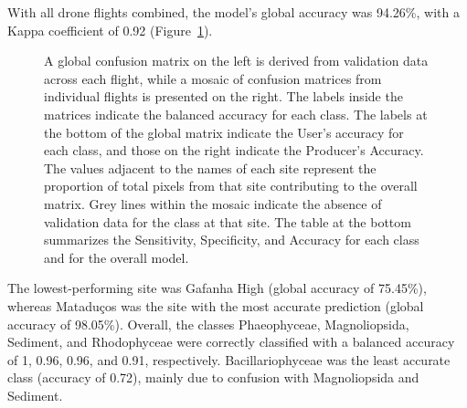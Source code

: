 \documentclass[
  letterpaper,
  11pt,
  english,
  singlespacing,
  headsepline]{MastersDoctoralThesis}
\begin{document}
\begin{spacing}{1.5}
With all drone flights combined, the model's global accuracy was
94.26\%, with a Kappa coefficient of 0.92 (Figure~\ref{fig-Validation}).

\begin{figure}


\caption{\label{fig-Validation}A global confusion matrix on the left is
derived from validation data across each flight, while a mosaic of
confusion matrices from individual flights is presented on the right.
The labels inside the matrices indicate the balanced accuracy for each
class. The labels at the bottom of the global matrix indicate the User's
accuracy for each class, and those on the right indicate the Producer's
Accuracy. The values adjacent to the names of each site represent the
proportion of total pixels from that site contributing to the overall
matrix. Grey lines within the mosaic indicate the absence of validation
data for the class at that site. The table at the bottom summarizes the
Sensitivity, Specificity, and Accuracy for each class and for the
overall model.}

\end{figure}%

The lowest-performing site was Gafanha High (global accuracy of
75.45\%), whereas Mataduços was the site with the most accurate
prediction (global accuracy of 98.05\%). Overall, the classes
Phaeophyceae, Magnoliopsida, Sediment, and Rhodophyceae were correctly
classified with a balanced accuracy of 1, 0.96, 0.96, and 0.91,
respectively. Bacillariophyceae was the least accurate class (accuracy
of 0.72), mainly due to confusion with Magnoliopsida and Sediment.


\end{spacing}
\end{document}
